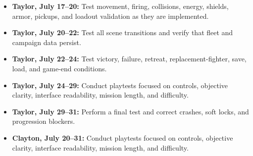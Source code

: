 \documentclass[journal]{IEEEtran}
\begin{document}
\begin{itemize}

    \item \textbf{Taylor, July 17--20:}
    Test movement, firing, collisions, energy, shields, armor, pickups, and loadout validation as they are implemented.

    \item \textbf{Taylor, July 20--22:}
    Test all scene transitions and verify that fleet and campaign data persist.

    \item \textbf{Taylor, July 22--24:}
    Test victory, failure, retreat, replacement-fighter, save, load, and game-end conditions.

    \item \textbf{Taylor, July 24--29:}
    Conduct playtests focused on controls, objective clarity, interface readability, mission length, and difficulty. 
    
    \item \textbf{Taylor, July 29--31:}
    Perform a final test and correct crashes, soft locks, and
    progression blockers.

    \item \textbf{Clayton, July 20--31:}
    Conduct playtests focused on controls, objective clarity, interface readability, mission length, and difficulty.
    

\end{itemize}
\end{document}
